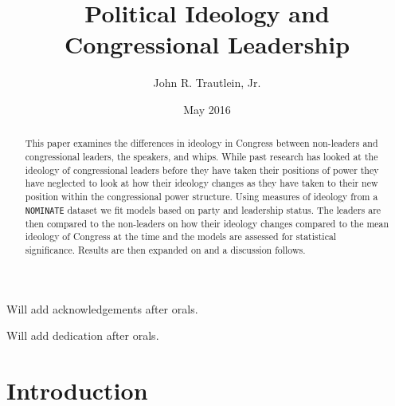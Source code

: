 \documentclass[12pt,twoside]{reedthesis}
\title{Political Ideology and Congressional Leadership}
\author{John R. Trautlein, Jr.}
\date{May 2016}
\begin{document}
      \maketitle
  
  \frontmatter %
  \pagestyle{empty} %

      \begin{acknowledgements}
      Will add acknowledgements after orals.
    \end{acknowledgements}
  
  

      \hypersetup{linkcolor=black}
    \setcounter{tocdepth}{2}
    \tableofcontents
  
      \listoftables
  
      \listoffigures
  
      \begin{abstract}
      This paper examines the differences in ideology in Congress between
      non-leaders and congressional leaders, the speakers, and whips. While
      past research has looked at the ideology of congressional leaders before
      they have taken their positions of power they have neglected to look at
      how their ideology changes as they have taken to their new position
      within the congressional power structure. Using measures of ideology
      from a \texttt{NOMINATE} dataset we fit models based on party and
      leadership status. The leaders are then compared to the non-leaders on
      how their ideology changes compared to the mean ideology of Congress at
      the time and the models are assessed for statistical significance.
      Results are then expanded on and a discussion follows.
    \end{abstract}
  
      \begin{dedication}
      Will add dedication after orals.
    \end{dedication}
  
  \mainmatter %
  \pagestyle{fancyplain} %

  \doublespacing
  
  \chapter*{Introduction}\label{introduction}
  
\end{document}
